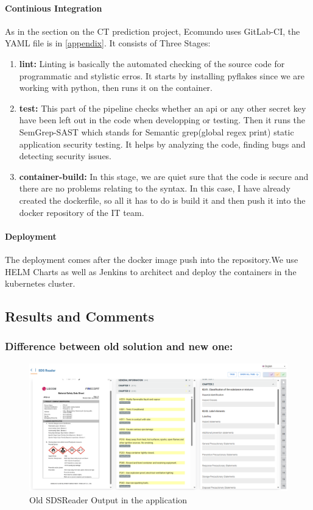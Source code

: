 \documentclass[a4paper,12pt,twoside]{report}
\begin{document}
\paragraph{Continious Integration}
As in the section on the CT prediction project, Ecomundo uses GitLab-CI, the YAML file is in \ref{appendix}. It consists of Three Stages:
\begin{enumerate}
\item \textbf{lint:} Linting is basically the automated checking of the source code for programmatic and stylistic erros. It starts by installing pyflakes since we are working with python, then runs it on the container.
\item \textbf{test:} This part of the pipeline checks whether an api or any other secret key have been left out in the code when developping or testing. Then it runs the SemGrep-SAST which stands for Semantic grep(global regex print) static application security testing. It helps by analyzing the code, finding bugs and detecting security issues.
\item \textbf{container-build:} In this stage, we are quiet sure that the code is secure and there are no problems relating to the syntax. In this case, I have already created the dockerfile, so all it has to do is build it and then push it into the docker repository of the IT team.
\end{enumerate}

\paragraph{Deployment}
The deployment comes after the docker image push into the repository.We use HELM Charts as well as Jenkins to architect and deploy the containers in the kubernetes cluster. 
\subsection{Results and Comments}
\subsubsection{Difference between old solution and new one:}

\begin{figure}[H]
		\includegraphics[width=\textwidth, keepaspectratio ]{images/oldSDSReader}
	\caption[Old SDSReader]{Old SDSReader Output in the application}
\label{oldSDSReader}
\end{figure}
\end{document}
